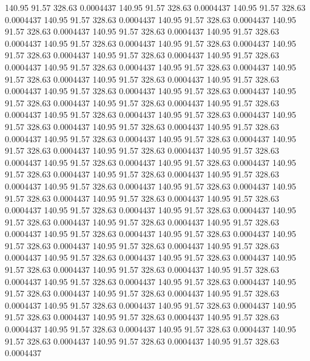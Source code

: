  140.95   91.57  328.63   0.0004437
 140.95   91.57  328.63   0.0004437
 140.95   91.57  328.63   0.0004437
 140.95   91.57  328.63   0.0004437
 140.95   91.57  328.63   0.0004437
 140.95   91.57  328.63   0.0004437
 140.95   91.57  328.63   0.0004437
 140.95   91.57  328.63   0.0004437
 140.95   91.57  328.63   0.0004437
 140.95   91.57  328.63   0.0004437
 140.95   91.57  328.63   0.0004437
 140.95   91.57  328.63   0.0004437
 140.95   91.57  328.63   0.0004437
 140.95   91.57  328.63   0.0004437
 140.95   91.57  328.63   0.0004437
 140.95   91.57  328.63   0.0004437
 140.95   91.57  328.63   0.0004437
 140.95   91.57  328.63   0.0004437
 140.95   91.57  328.63   0.0004437
 140.95   91.57  328.63   0.0004437
 140.95   91.57  328.63   0.0004437
 140.95   91.57  328.63   0.0004437
 140.95   91.57  328.63   0.0004437
 140.95   91.57  328.63   0.0004437
 140.95   91.57  328.63   0.0004437
 140.95   91.57  328.63   0.0004437
 140.95   91.57  328.63   0.0004437
 140.95   91.57  328.63   0.0004437
 140.95   91.57  328.63   0.0004437
 140.95   91.57  328.63   0.0004437
 140.95   91.57  328.63   0.0004437
 140.95   91.57  328.63   0.0004437
 140.95   91.57  328.63   0.0004437
 140.95   91.57  328.63   0.0004437
 140.95   91.57  328.63   0.0004437
 140.95   91.57  328.63   0.0004437
 140.95   91.57  328.63   0.0004437
 140.95   91.57  328.63   0.0004437
 140.95   91.57  328.63   0.0004437
 140.95   91.57  328.63   0.0004437
 140.95   91.57  328.63   0.0004437
 140.95   91.57  328.63   0.0004437
 140.95   91.57  328.63   0.0004437
 140.95   91.57  328.63   0.0004437
 140.95   91.57  328.63   0.0004437
 140.95   91.57  328.63   0.0004437
 140.95   91.57  328.63   0.0004437
 140.95   91.57  328.63   0.0004437
 140.95   91.57  328.63   0.0004437
 140.95   91.57  328.63   0.0004437
 140.95   91.57  328.63   0.0004437
 140.95   91.57  328.63   0.0004437
 140.95   91.57  328.63   0.0004437
 140.95   91.57  328.63   0.0004437
 140.95   91.57  328.63   0.0004437
 140.95   91.57  328.63   0.0004437
 140.95   91.57  328.63   0.0004437
 140.95   91.57  328.63   0.0004437
 140.95   91.57  328.63   0.0004437
 140.95   91.57  328.63   0.0004437
 140.95   91.57  328.63   0.0004437
 140.95   91.57  328.63   0.0004437
 140.95   91.57  328.63   0.0004437
 140.95   91.57  328.63   0.0004437
 140.95   91.57  328.63   0.0004437
 140.95   91.57  328.63   0.0004437
 140.95   91.57  328.63   0.0004437
 140.95   91.57  328.63   0.0004437
 140.95   91.57  328.63   0.0004437
 140.95   91.57  328.63   0.0004437
 140.95   91.57  328.63   0.0004437
 140.95   91.57  328.63   0.0004437
 140.95   91.57  328.63   0.0004437
